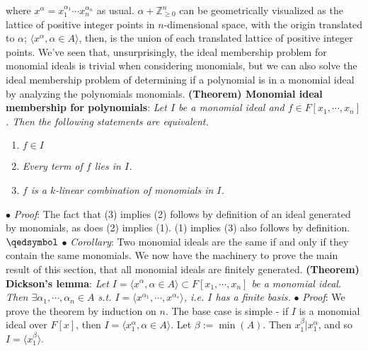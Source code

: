 \documentclass{article}
\begin{document}
where $ x^\alpha = x_1^{\alpha_1} \cdots x_n^{\alpha_n} $ as usual.
\newline
$ \alpha + \mathbb{Z}_{\geq 0}^n $ can be geometrically visualized as the lattice of positive integer points in $ n $-dimensional space, with the origin translated to $ \alpha $; $ \langle x^\alpha, \alpha \in A \rangle $, then, is the union of each translated lattice of positive integer points.
\newline
We've seen that, unsurprisingly, the ideal membership problem for monomial ideals is trivial when considering monomials, but we can also solve the ideal membership problem of determining if a polynomial is in a monomial ideal by analyzing the polynomials monomials.
\newline \newline
\textbf{(Theorem) Monomial ideal membership for polynomials}: \textit{Let $ I $ be a monomial ideal and $ f \in F[x_1, \cdots, x_n] $. Then the following statements are equivalent.}
\begin{enumerate}
	\item \textit{$ f \in I $}
	\item \textit{Every term of $ f $ lies in $ I $.}
	\item \textit{$ f $ is a $ k $-linear combination of monomials in $ I $.}
\end{enumerate}
\indent $ \bullet $ \textit{Proof}: The fact that (3) implies (2) follows by definition of an ideal generated by monomials, as does (2) implies (1). (1) implies (3) also follows by definition. $ \qedsymbol $
\newline
\indent $ \bullet $ \textit{Corollary}: Two monomial ideals are the same if and only if they contain the same monomials.
\newline \newline
We now have the machinery to prove the main result of this section, that all monomial ideals are finitely generated.
\newline \newline
\textbf{(Theorem) Dickson's lemma}: \textit{Let $ I = \langle x^\alpha, \alpha \in A \rangle \subset F[x_1, \cdots, x_n] $ be a monomial ideal. Then $ \exists \alpha_1, \cdots, \alpha_n \in A $ s.t. $ I = \langle x^{\alpha_1}, \cdots, x^{\alpha_s} \rangle $, i.e. $ I $ has a finite basis.}
\newline
\indent $ \bullet $ \textit{Proof}: We prove the theorem by induction on $ n $. The base case is simple - if $ I $ is a monomial ideal over $ F[x] $, then $ I = \langle x_1^\alpha, \alpha \in A \rangle $. Let $ \beta := \min(A) $. Then $ x_1^\beta | x_1^\alpha $, and so $ I = \langle x_1^\beta \rangle $.
\end{document}
